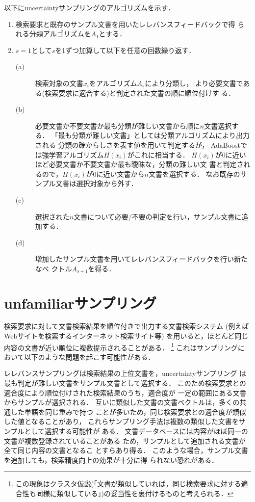 以下にuncertaintyサンプリングのアルゴリズムを示す．
\begin{enumerate}
\item 検索要求と既存のサンプル文書を用いたレレバンスフィードバックで得
られる分類アルゴリズムを$A_{1}$とする．
\item $s=1$として$s$を1ずつ加算して以下を任意の回数繰り返す．
\begin{description}
\item[(a)] 検索対象の文書$x_{i}$をアルゴリズム$A_{s}$により分類し，
より必要文書である(検索要求に適合する)と判定された文書の順に順位付けす
る．
\item[(b)] 必要文書か不要文書か最も分類が難しい文書から順に$n$文書選択する．
「最も分類が難しい文書」としては分類アルゴリズムにより出力される
分類の確からしさを表す値を用いて判定するが，
AdaBoostでは強学習アルゴリズム$H(x_{i})$がこれに相当する．
$H(x_{i})$が0に近いほど必要文書か不要文書か最も曖昧な，分類の難しい文
書と判定されるので，$H(x_{i})$が0に近い文書から$n$文書を選択する．
なお既存のサンプル文書は選択対象から外す．
\item[(c)] 選択された$n$文書について必要/不要の判定を行い，サンプル文書に追
加する．
\item[(d)] 増加したサンプル文書を用いてレレバンスフィードバックを行い新たなベ
クトル$A_{s+1}$を得る．
\end{description}
\end{enumerate}

\section{unfamiliarサンプリング}
検索要求に対して文書検索結果を順位付きで出力する文書検索システム
(例えばWebサイトを検索するインターネット検索サイト等)
を用いると，ほとんど同じ内容の文書が近い順位に複数提示されることがある．
\footnote{この現象はクラスタ仮説(「文書が類似していれば，同じ検索要求に対する適合性も同様に類似している」\cite{bib:Cluster_hypo})の妥当性を裏付けるものと考えられる．}
これはサンプリングにおいて以下のような問題を起こす可能性がある．

レレバンスサンプリングは検索結果の上位文書を，uncertaintyサンプリング
は最も判定が難しい文書をサンプル文書として選択する．
このため検索要求との適合度により順位付けされた検索結果のうち，適合度が
一定の範囲にある文書からサンプルが選択される．
互いに類似した文書の文書ベクトルは，多くの共通した単語を同じ重みで持つ
ことが多いため，同じ検索要求との適合度が類似した値となることがあり，
これらサンプリング手法は複数の類似した文書をサンプルとして選択する可能性が
ある．
文書データベースには内容がほぼ同一の文書が複数登録されていることがある
ため，サンプルとして追加される文書が全て同じ内容の文書となるこ
とすらあり得る．
このような場合，サンプル文書を追加しても，検索精度向上の効果が十分に得
られない恐れがある．

